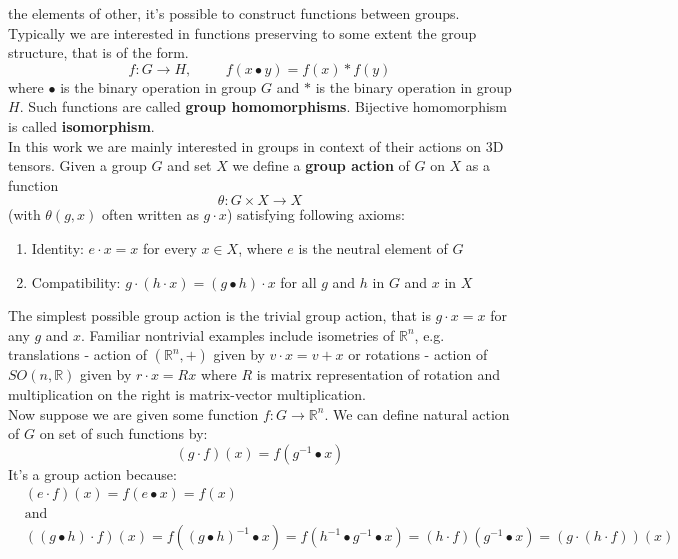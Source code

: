         the elements of other, it's possible to construct functions between groups.
        Typically we are interested in functions preserving to some extent the group structure,
        that is of the form.
        \begin{equation}
            f:G \to H, \hspace{1cm} f(x\bullet y) = f(x) \ast f(y)
        \end{equation}
        where $\bullet$ is the binary operation in group $G$ and $\ast$ is the binary operation
        in group $H$. Such functions are called \textbf{group homomorphisms}.
        Bijective homomorphism is called \textbf{isomorphism}.\\

        In this work we are mainly interested in groups in context of their actions
        on 3D tensors. Given a group $G$ and set $X$ we define a
        \textbf{group action} of $G$ on $X$ as a function
        \begin{equation}
            \theta: G \times X \to X
        \end{equation}
        (with $\theta(g,x)$ often written as $g\cdot x$) satisfying following axioms:
        \begin{enumerate}
            \item Identity: $e \cdot x = x$ for every $x \in X$, where $e$ is the neutral element
                    of $G$
            \item Compatibility: $g \cdot \left(h \cdot x\right) =
                \left(g \bullet h \right) \cdot x$ for all $g$ and $h$ in $G$ and $x$ in $X$
        \end{enumerate}
        The simplest possible group action is the trivial group action, that is
        $g\cdot x = x$ for any $g$ and $x$. Familiar nontrivial examples include isometries
        of $\mathbb{R}^n$, e.g.
        translations - action of $\left(\mathbb{R}^n,+\right)$ given by $v \cdot x = v+x$ or
        rotations - action of $SO(n,\mathbb{R})$ given by $r \cdot x = Rx$ where
        $R$ is matrix representation of rotation and
        multiplication on the right is matrix-vector multiplication.\\
        Now suppose we are given some function $f:G\to \mathbb{R}^n$.
        We can define natural action of $G$ on set of such functions by:
        \begin{equation}
            (g\cdot f)(x) = f(g^{-1}\bullet x)
            \label{eq:action_on_function}
        \end{equation}
        It's a group action because:
        \begin{align*}
            & (e\cdot f)(x) = f(e\bullet x) = f(x) \\
            & \mbox{and} \\
            & ((g\bullet h) \cdot f)(x) = f((g\bullet h)^{-1} \bullet x) =
            f(h^{-1}\bullet g^{-1} \bullet x) = (h\cdot f)(g^{-1} \bullet x) =
            (g\cdot(h \cdot f))(x)
        \end{align*}








